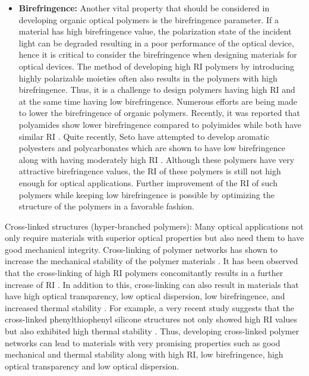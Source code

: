 \begin{itemize}
	\item\textbf{Birefringence:} Another vital property that should be considered in developing organic optical polymers is the birefringence parameter. If a material has high birefringence value, the polarization state of the incident light can be degraded resulting in a poor performance of the optical device, hence it is critical to consider the birefringence when designing materials for optical devices. The method of developing high RI polymers by introducing highly polarizable moieties often also results in the polymers with high birefringence. Thus, it is a challenge to design polymers having high RI and at the same time having low birefringence.  Numerous efforts are being made to lower the birefringence of organic polymers.  Recently, it was reported that polyamides show lower birefringence compared to polyimides while both have similar RI \cite{Javadi2013}. Quite recently, Seto \etal have attempted to develop aromatic polyesters and polycarbonates which are shown to have low birefringence along with having moderately high RI \cite{Seto2010}. Although these polymers have very attractive birefringence values, the RI of these polymers is still not high enough for optical applications. Further improvement of the RI of such polymers while keeping low birefringence is possible by optimizing the structure of the polymers in a favorable fashion.
\end{itemize}

Cross-linked structures (hyper-branched polymers): 
Many optical applications not only require materials with superior optical properties but also need them to have good mechanical integrity. Cross-linking of polymer networks has shown to increase the mechanical stability of the polymer materials \cite{Griebel2014,Bhagat2012,Mosley2014,Lin2010a,Jim2009a}. It has been observed that the cross-linking of high RI polymers concomitantly results in a further increase of RI \cite{Griebel2014}. In addition to this, cross-linking can also result in materials that have high optical transparency, low optical dispersion, low birefringence, and increased thermal stability \cite{Jim2009a,Lin2010a}. For example, a very recent study suggests that the cross-linked phenylthiophenyl silicone structures not only showed high RI values but also exhibited high thermal stability \cite{Mosley2014}. Thus, developing cross-linked polymer networks can lead to materials with very promising properties such as good mechanical and thermal stability along with high RI, low birefringence, high optical transparency and low optical dispersion. 

